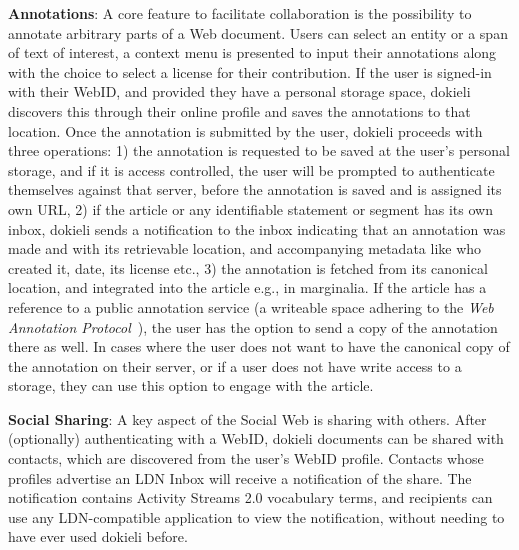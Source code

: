 \documentclass[a4paper]{llncs}
\begin{document}
                                    
\par \textbf{Annotations}: A core feature to facilitate collaboration is the possibility to annotate arbitrary parts of a Web document.
                                    Users can select an entity or a span of text of interest, a context menu is presented to input their annotations along with the choice to select a license for their contribution.
                                    If the user is signed-in with their WebID, and provided they have a personal storage space, dokieli discovers this through their online profile and saves the annotations to that location.
                                    Once the annotation is submitted by the user, dokieli proceeds with three operations: 1) the annotation is requested to be saved at the user’s personal storage, and if it is access controlled, the user will be prompted to authenticate themselves against that server, before the annotation is saved and is assigned its own URL, 2) if the article or any identifiable statement or segment has its own inbox, dokieli sends a notification to the inbox indicating that an annotation was made and with its retrievable location, and accompanying metadata like who created it, date, its license etc., 3) the annotation is fetched from its canonical location, and integrated into the article e.g., in marginalia. If the article has a reference to a public annotation service (a writeable space adhering to the \textit{Web Annotation Protocol}~\cite{ref-15}), the user has the option to send a copy of the annotation there as well. In cases where the user does not want to have the canonical copy of the annotation on their server, or if a user does not have write access to a storage, they can use this option to engage with the article.
                                    

                                    
\par \textbf{Social Sharing}: A key aspect of the Social Web is sharing with others.
                                    After (optionally) authenticating with a WebID, dokieli documents can be shared with contacts, which are discovered from the user’s WebID profile. Contacts whose profiles advertise an LDN Inbox will receive a notification of the share. The notification contains Activity Streams 2.0 vocabulary terms, and recipients can use any LDN-compatible application to view the notification, without needing to have ever used dokieli before.
\end{document}
